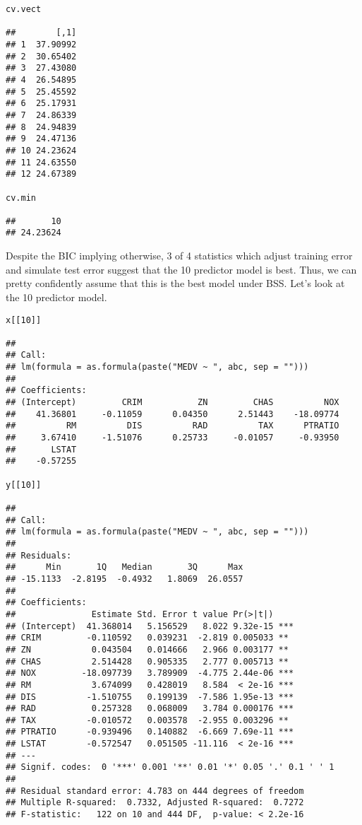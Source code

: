 \documentclass[]{article}
\begin{document}
\begin{verbatim}
cv.vect

##        [,1]
## 1  37.90992
## 2  30.65402
## 3  27.43080
## 4  26.54895
## 5  25.45592
## 6  25.17931
## 7  24.86339
## 8  24.94839
## 9  24.47136
## 10 24.23624
## 11 24.63550
## 12 24.67389

cv.min

##       10 
## 24.23624
\end{verbatim}

Despite the BIC implying otherwise, 3 of 4 statistics which adjust
training error and simulate test error suggest that the 10 predictor
model is best. Thus, we can pretty confidently assume that this is the
best model under BSS. Let's look at the 10 predictor model.

\begin{verbatim}
x[[10]]

## 
## Call:
## lm(formula = as.formula(paste("MEDV ~ ", abc, sep = "")))
## 
## Coefficients:
## (Intercept)         CRIM           ZN         CHAS          NOX  
##    41.36801     -0.11059      0.04350      2.51443    -18.09774  
##          RM          DIS          RAD          TAX      PTRATIO  
##     3.67410     -1.51076      0.25733     -0.01057     -0.93950  
##       LSTAT  
##    -0.57255

y[[10]]

## 
## Call:
## lm(formula = as.formula(paste("MEDV ~ ", abc, sep = "")))
## 
## Residuals:
##      Min       1Q   Median       3Q      Max 
## -15.1133  -2.8195  -0.4932   1.8069  26.0557 
## 
## Coefficients:
##               Estimate Std. Error t value Pr(>|t|)    
## (Intercept)  41.368014   5.156529   8.022 9.32e-15 ***
## CRIM         -0.110592   0.039231  -2.819 0.005033 ** 
## ZN            0.043504   0.014666   2.966 0.003177 ** 
## CHAS          2.514428   0.905335   2.777 0.005713 ** 
## NOX         -18.097739   3.789909  -4.775 2.44e-06 ***
## RM            3.674099   0.428019   8.584  < 2e-16 ***
## DIS          -1.510755   0.199139  -7.586 1.95e-13 ***
## RAD           0.257328   0.068009   3.784 0.000176 ***
## TAX          -0.010572   0.003578  -2.955 0.003296 ** 
## PTRATIO      -0.939496   0.140882  -6.669 7.69e-11 ***
## LSTAT        -0.572547   0.051505 -11.116  < 2e-16 ***
## ---
## Signif. codes:  0 '***' 0.001 '**' 0.01 '*' 0.05 '.' 0.1 ' ' 1
## 
## Residual standard error: 4.783 on 444 degrees of freedom
## Multiple R-squared:  0.7332, Adjusted R-squared:  0.7272 
## F-statistic:   122 on 10 and 444 DF,  p-value: < 2.2e-16
\end{verbatim}
\end{document}
